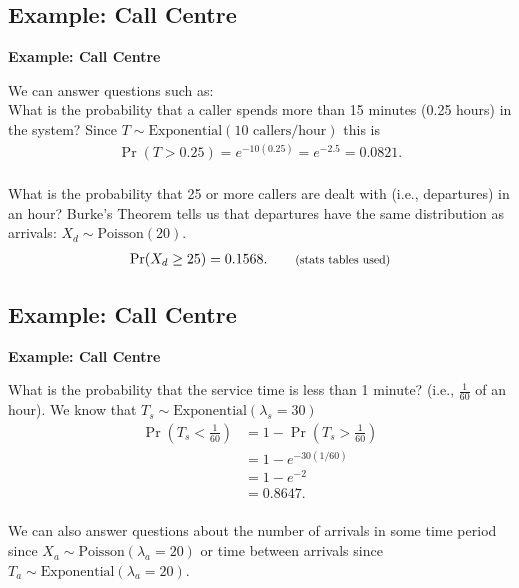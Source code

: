 \documentclass[compress]{beamer}        %
\makeatletter
\newcommand{\tcb}{\textcolor{beamer@blendedblue}}
\makeatother
\begin{document}
\subsection{Example: Call Centre}
\begin{frame}{\bf \tcb{Example: Call Centre}}

We can answer questions such as:\\[0.3cm]

What is the probability that a caller spends more than 15 minutes (0.25 hours) in the system? Since $T \sim \text{Exponential}(10 \text{ callers/hour})$ this is
\begin{align*}
\Pr(T > 0.25) = e^{-10(0.25)} = e^{-2.5} = 0.0821.\\
\end{align*}

What is the probability that 25 or more callers are dealt with (i.e., departures) in an hour? Burke's Theorem tells us that departures have the same distribution as arrivals: $X_d \sim \text{Poisson}(20)$.
\begin{align*}
\Pr(X_d \ge 25) = 0.1568. \qquad\text{{\footnotesize(stats tables used)}}
\end{align*}

\end{frame}




\subsection{Example: Call Centre}
\begin{frame}{\bf \tcb{Example: Call Centre}}

What is the probability that the service time is less than 1 minute? (i.e., $\frac{1}{60}$ of an hour). We know that $T_s \sim \text{Exponential}(\lambda_s = 30)$
\begin{align*}
\Pr(T_s < \tfrac{1}{60}) &= 1 - \Pr(T_s > \tfrac{1}{60}) \\
&= 1 - e^{-30(1/60)} \\
&= 1 - e^{-2} \\
&= 0.8647.\\
\end{align*}

We can also answer questions about the number of arrivals in some time period since $X_a \sim \text{Poisson}(\lambda_a = 20)$ or time between arrivals since $T_a \sim \text{Exponential}(\lambda_a = 20)$.


\end{frame}
\end{document}
